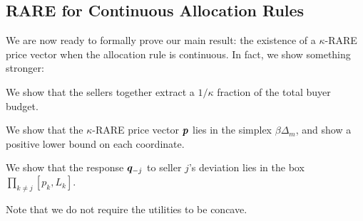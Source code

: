 \subsection{RARE for Continuous Allocation Rules}
\label{sec:exist:continuous}

We are now ready to formally prove our main result:
the existence of a $\kappa$-RARE price vector
when the allocation rule is continuous.
In fact, we show something stronger:
\begin{tightenum}
\item We show that the sellers together extract a $1/\kappa$ fraction of the total buyer budget.
\item We show that the $\kappa$-RARE price vector $\bm{p}$ lies in the simplex $\beta\Delta_m$,
    and show a positive lower bound on each coordinate.
\item We show that the response $\bm{q}_{-j}$ to seller $j$'s deviation
    lies in the box $\prod_{k \neq j} [p_k, L_k]$.
\end{tightenum}
Note that we do not require the utilities to be concave.

